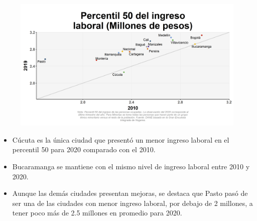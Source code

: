     \begin{figure}[H]
    \caption[Percentil 50 del ingreso laboral por ciudades principales - 2010 VS 2019]{\label{ingreso_laboral_50_ciudades_vs}}
        \begin{center}
        \includegraphics[width=\textwidth,keepaspectratio]{img/var_25605_scatter_time.png}
        \end{center}
    \end{figure}
            \begin{itemize}
                    \item Cúcuta es la única ciudad que presentó un menor ingreso laboral en el percentil 50 para 2020 comparado con el 2010.
                    \item Bucaramanga se mantiene con el mismo nivel de ingreso laboral entre 2010 y 2020.
                    \item Aunque las demás ciudades presentan mejoras, se destaca que Pasto pasó de ser una de las ciudades con menor ingreso laboral, por debajo de 2 millones, a tener poco más de 2.5 millones en promedio para 2020.
                \end{itemize}

